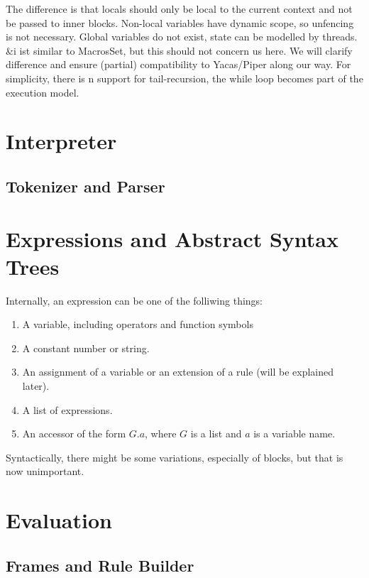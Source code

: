 The difference is that locals should only be local to
the current context and not be passed to inner blocks.
Non-local variables have dynamic scope, so unfencing
is not necessary. Global variables do not exist, state
can be modelled by threads. 
\&i ist similar to MacrosSet, but this should not concern
us here. We will clarify difference and ensure (partial)
compatibility to Yacas/Piper along our way.
For simplicity, there is n
support for tail-recursion, the while loop becomes part
of the execution model.


\chapter{Interpreter}

\section{Tokenizer and Parser}

\chapter{Expressions and Abstract Syntax Trees}

Internally, an expression can be one of the folliwing things:

\begin{enumerate}
\item A variable, including operators and function symbols
\item A constant number or string.
\item An assignment of a variable or an extension of a rule (will be explained later).
\item A list of expressions.
\item An accessor of the form $G.a$, where $G$ is a list and $a$ is a variable name.
\end{enumerate}

Syntactically, there might be some variations, especially of blocks, but that is 
now unimportant.




\chapter{Evaluation}


\section{Frames and Rule Builder}

